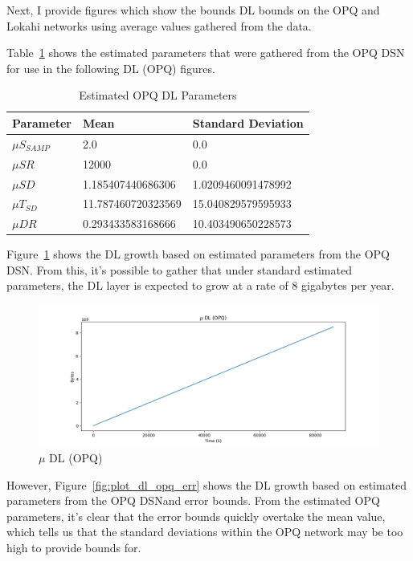 Next, I provide figures which show the bounds DL bounds on the OPQ and Lokahi networks using average values gathered from the data.

Table~\ref{table:dl:opq} shows the estimated parameters that were gathered from the OPQ DSN for use in the following DL (OPQ) figures.

\begin{table}[H]
	\centering
	\caption{Estimated OPQ DL Parameters}
	\begin{tabularx}{\textwidth}{llX}
		\toprule
		\textbf{Parameter} & \textbf{Mean} & \textbf{Standard Deviation} \\
		\midrule
		$\mu S_{SAMP}$ & 2.0 & 0.0 \\
		$\mu SR$ & 12000 & 0.0 \\
		$\mu SD$ & 1.185407440686306 & 1.0209460091478992 \\
		$\mu T_{SD}$ & 11.787460720323569 & 15.040829579595933 \\
		$\mu DR$ & 0.293433583168666 & 10.403490650228573 \\
		\bottomrule
	\end{tabularx}
	\label{table:dl:opq}
\end{table}


Figure~\ref{fig:plot_dl_opq_no_err} shows the DL growth based on estimated parameters from the OPQ DSN\@. From this, it's possible to gather that under standard estimated parameters, the DL layer is expected to grow at a rate of 8 gigabytes per year.

\begin{figure}[H]
	\centering
	\includegraphics[width=\linewidth]{figures/plot_dl_opq_no_err.png}
	\caption{$\mu$ DL (OPQ)}
	\label{fig:plot_dl_opq_no_err}
\end{figure}

However, Figure~\ref{fig:plot_dl_opq_err} shows the DL growth based on estimated parameters from the OPQ DSN\@ and error bounds. From the estimated OPQ parameters, it's clear that the error bounds quickly overtake the mean value, which tells us that the standard deviations within the OPQ network may be too high to provide bounds for.

